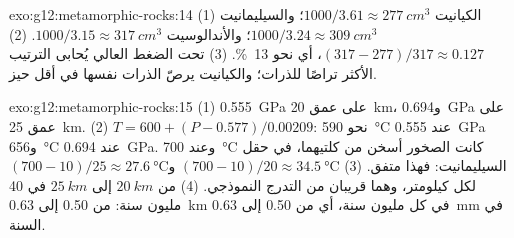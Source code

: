 \begin{solution}{exo:g12:metamorphic-rocks:14}
(1) الكيانيت $1000/3.61 \approx \qty{277}{cm^3}$؛ والسيليمانيت $1000/3.24
\approx \qty{309}{cm^3}$؛ والأندالوسيت $1000/3.15 \approx \qty{317}{cm^3}$.
(2) $(317 - 277)/317 \approx 0.127$، أي نحو \qty{13}{\percent}. (3) تحت
الضغط العالي يُحابى الترتيب الأكثر تراصًا للذرات؛ والكيانيت
يرصّ الذرات نفسها في أقل حيز.
\end{solution}

\begin{solution}{exo:g12:metamorphic-rocks:15}
(1) \qty{0.555}{GPa} على عمق \qty{20}{km}، و\qty{0.694}{GPa} على عمق \qty{25}{km}.
(2) $T = 600 + (P - 0.577)/0.00209$: نحو \qty{590}{\celsius} عند
\qty{0.555}{GPa} و\qty{656}{\celsius} عند \qty{0.694}{GPa}. وعند
\qty{700}{\celsius} كانت الصخور أسخن من كلتيهما، في حقل
السيليمانيت: فهذا متفق. (3) $(700 - 10)/20 \approx \qty{34.5}{\celsius}$
و$(700 - 10)/25 \approx \qty{27.6}{\celsius}$ لكل كيلومتر، وهما قريبان من
التدرج النموذجي. (4) من $\qty{20}{km}$ إلى $\qty{25}{km}$ في 40 مليون سنة:
من 0.50 إلى \qty{0.63}{km} في كل مليون سنة، أي من 0.50 إلى \qty{0.63}{mm} في
السنة.
\end{solution}

